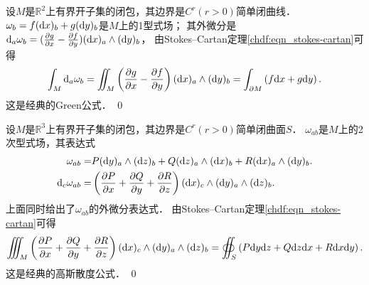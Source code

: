 \begin{example}
    设$M$是$\mathbb{R}^2$上有界开子集的闭包，其边界是$C^r(r>0)$简单闭曲线．
    $\omega_b = f ({\rm d}x)_b + g ({\rm d}y)_b$是$M$上的1型式场；
    其外微分是${\rm d}_a\omega_b= (\frac{\partial g}{\partial x}
    -\frac{\partial f}{\partial y})({\rm d}x)_a \wedge ({\rm d}y)_b$，
    由Stokes--Cartan定理\eqref{chdf:eqn_stokes-cartan}可得
    \begin{equation}
        \int_{M} {\rm d}_a \omega_b = \iint_{M} \left(\frac{\partial g}{\partial x}
        -\frac{\partial f}{\partial y}\right) ({\rm d}x)_a \wedge ({\rm d}y)_b
        =  \int_{\partial M} \left(f {\rm d}x + g {\rm d}y \right).
    \end{equation}
    这是经典的Green公式． \qed
\end{example}

\begin{example}
    设$M$是$\mathbb{R}^3$上有界开子集的闭包，其边界是$C^r(r>0)$简单闭曲面$S$．
    $\omega_{ab}$是$M$上的2次型式场，其表达式
    \begin{align}
       \omega_{ab} =& P({\rm d}y)_a\wedge ({\rm d}z)_b +
          Q({\rm d}z)_a\wedge ({\rm d}x)_b+ R({\rm d}x)_a\wedge ({\rm d}y)_b . \\
       {\rm d}_c\omega_{ab} =& \left(\frac{\partial P}{\partial x}
        + \frac{\partial Q}{\partial y} +\frac{\partial R}{\partial z} \right)
       ({\rm d}x)_c\wedge ({\rm d}y)_a\wedge ({\rm d}z)_b  .
    \end{align}
    上面同时给出了$\omega_{ab}$的外微分表达式．
    由Stokes--Cartan定理\eqref{chdf:eqn_stokes-cartan}可得
    \begin{equation*}
        \iiint_{M} \left(\frac{\partial P}{\partial x}
        + \frac{\partial Q}{\partial y} +\frac{\partial R}{\partial z} \right)
        ({\rm d}x)_c\wedge ({\rm d}y)_a\wedge ({\rm d}z)_b
        =  \oiint_{S} \left(P {\rm d}y {\rm d}z +
        Q {\rm d}z {\rm d}x + R {\rm d}x {\rm d}y \right).
    \end{equation*}
    这是经典的高斯散度公式． \qed
\end{example}

